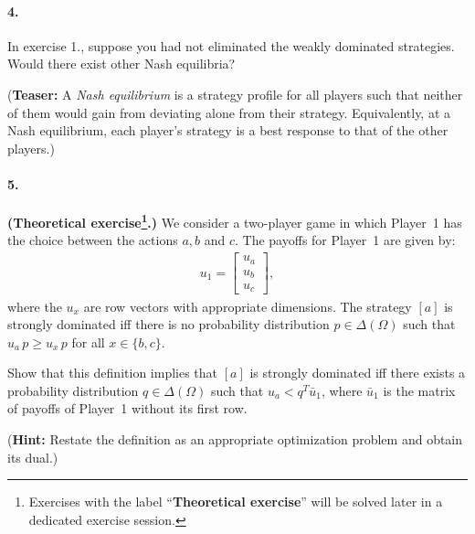 \documentclass[a4paper,notitlepage,12pt]{article}
\begin{document}
\paragraph{4. } In exercise 1., suppose you had not eliminated the weakly dominated strategies. Would there exist other Nash equilibria?

(\textbf{Teaser:} A \emph{Nash equilibrium} is a strategy profile for all players such that neither of them would gain from deviating alone from their strategy. Equivalently, at a Nash equilibrium, each player's strategy is a best response to that of the other players.)


\paragraph{5. } \textbf{(Theoretical exercise\footnote{\footnotesize Exercises with the label ``\textbf{Theoretical exercise}'' will be solved later in a dedicated exercise session.}.)} We consider a two-player game in which Player~1 has the choice between the actions $a, b$ and $c$. The payoffs for Player~1 are given by:
\begin{align*}
	u_1 = \begin{bmatrix} u_a \\ u_b \\ u_c \end{bmatrix},
\end{align*} 
where the $u_x$ are row vectors with appropriate dimensions. The strategy $[a]$ is strongly dominated iff there is no probability distribution $p \in \Delta(\Omega)$ such that $u_a \, p \geq u_x \, p$ for all $x \in \{ b, c \}$.

Show that this definition implies that $[a]$ is strongly dominated iff there exists a probability distribution $q \in \Delta(\Omega)$ such that $u_a < q^T \bar{u}_1$, where $\bar{u}_1$ is the matrix of payoffs of Player~1 without its first row.

(\textbf{Hint:} Restate the definition as an appropriate optimization problem and obtain its dual.)
\end{document}
